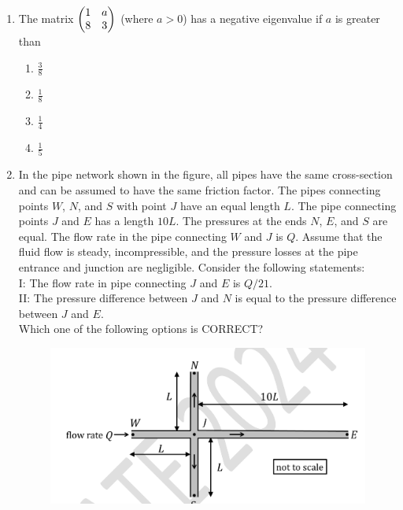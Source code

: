 \documentclass[journal,11pt,onecolumn]{IEEEtran}
\begin{document}
\begin{enumerate}[resume]

    \item The matrix $\begin{pmatrix}1 & a \\ 8 & 3\end{pmatrix}$ (where $a > 0$) has a negative eigenvalue if $a$ is greater than

          \begin{enumerate}
              \item $\frac{3}{8}$\vspace{0.5cm}
              \item $\frac{1}{8}$\vspace{0.5cm}
              \item $\frac{1}{4}$\vspace{0.5cm}
              \item $\frac{1}{5}$
          \end{enumerate}

    \item In the pipe network shown in the figure, all pipes have the same cross-section and can be assumed to have the same friction factor. The pipes connecting points $W$, $N$, and $S$ with point $J$ have an equal length $L$. The pipe connecting points $J$ and $E$ has a length $10L$. The pressures at the ends $N$, $E$, and $S$ are equal. The flow rate in the pipe connecting $W$ and $J$ is $Q$. Assume that the fluid flow is steady, incompressible, and the pressure losses at the pipe entrance and junction are negligible. Consider the following statements:\\

          I: The flow rate in pipe connecting $J$ and $E$ is $Q/21$.\\
          II: The pressure difference between $J$ and $N$ is equal to the pressure difference between $J$ and $E$.\\

          Which one of the following options is CORRECT?

          \begin{figure}[H]
              \centering
              \caption{}
              \includegraphics[scale=0.2]{q37}
              \label{fig:q37}
          \end{figure}


\end{enumerate}
\end{document}
